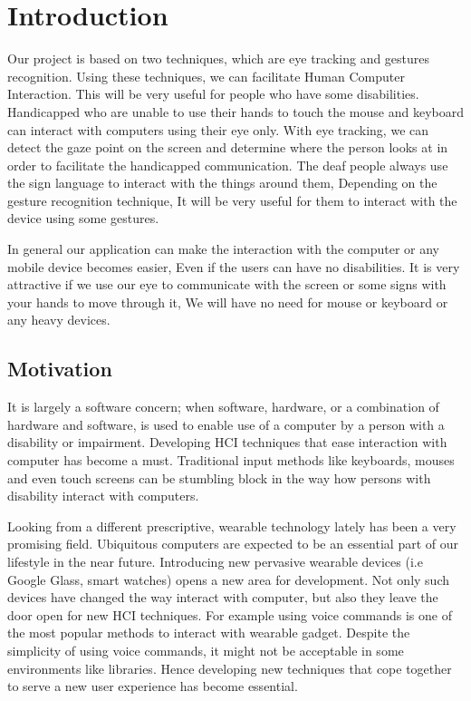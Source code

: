 \chapter{Introduction}
Our project is based on two techniques, which are eye tracking and gestures recognition. Using these techniques, we can facilitate Human Computer Interaction. This will be very useful for people who have some disabilities. Handicapped who are unable to use their hands to touch the mouse and keyboard can interact with computers using their eye only. With eye tracking, we can detect the gaze point on the screen and determine where the person looks at in order to facilitate the handicapped communication. The deaf people always use the sign language to interact with the things around them, Depending on the gesture recognition technique, It will be very useful for them to interact with the device using some gestures. \bigskip

In general our application can make the interaction with the computer or any mobile device becomes easier, Even if the users can have no disabilities. It is very attractive if we use our eye to communicate with the screen or some signs with your hands to move through it, We will have no need for mouse or keyboard or any heavy devices.

\section{Motivation} 
It is largely a software concern; when software, hardware, or a combination of hardware and software, is used to enable use of a computer by a person with a disability or impairment. Developing HCI techniques that ease interaction with computer has become a must. Traditional input methods like keyboards, mouses and even touch screens can be stumbling block in the way how persons with disability interact with computers. \bigskip

Looking from a different prescriptive, wearable technology lately has been a very promising field. Ubiquitous computers are expected to be an essential part of our lifestyle in the near future. Introducing new pervasive wearable devices (i.e Google Glass, smart watches) opens a new area for development. Not only such devices have  changed the way interact with computer, but also they leave the door open for new HCI techniques. For example using voice commands is one of the most popular methods to interact with wearable gadget. Despite the simplicity of using voice commands, it might not be acceptable in some environments like libraries. Hence developing new techniques that cope together to serve a new user experience has become essential. \bigskip


